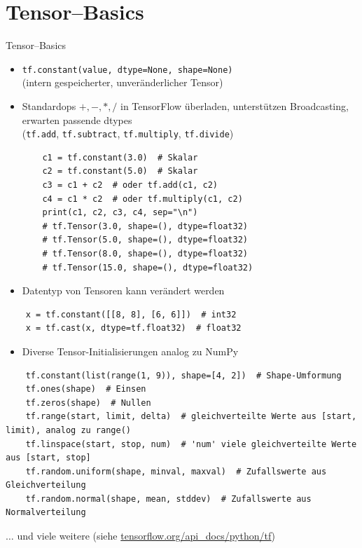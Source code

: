\documentclass[utf8, smaller, c]{beamer}
\renewcommand{\tt}[1]{{\texttt{#1}}}
\begin{document}
\section{Tensor--Basics}
\begin{frame}{Tensor--Basics}
	\begin{itemize}
		\item \tt{tf.constant(value, dtype=None, shape=None)}\\(intern gespeicherter, unveränderlicher Tensor)
		\item Standardops $+,-,*,/$ in TensorFlow überladen, unterstützen Broadcasting, erwarten passende dtypes\\(\tt{tf.add}, \tt{tf.subtract}, \tt{tf.multiply}, \tt{tf.divide})
	\begin{lstlisting}
	c1 = tf.constant(3.0)  # Skalar
    c2 = tf.constant(5.0)  # Skalar
    c3 = c1 + c2  # oder tf.add(c1, c2)
    c4 = c1 * c2  # oder tf.multiply(c1, c2)
    print(c1, c2, c3, c4, sep="\n")
	# tf.Tensor(3.0, shape=(), dtype=float32)
    # tf.Tensor(5.0, shape=(), dtype=float32)
    # tf.Tensor(8.0, shape=(), dtype=float32)
    # tf.Tensor(15.0, shape=(), dtype=float32)
	\end{lstlisting}
	\end{itemize}

    \framebreak
    
    \begin{itemize}
        \item Datentyp von Tensoren kann verändert werden
    \end{itemize}
    \begin{lstlisting}
    x = tf.constant([[8, 8], [6, 6]])  # int32
    x = tf.cast(x, dtype=tf.float32)  # float32
    \end{lstlisting}
    \begin{itemize}
        \item Diverse Tensor-Initialisierungen analog zu NumPy
    \end{itemize}
    \begin{lstlisting}
    tf.constant(list(range(1, 9)), shape=[4, 2])  # Shape-Umformung
    tf.ones(shape)  # Einsen
    tf.zeros(shape)  # Nullen
    tf.range(start, limit, delta)  # gleichverteilte Werte aus [start, limit), analog zu range()
    tf.linspace(start, stop, num)  # 'num' viele gleichverteilte Werte aus [start, stop]
    tf.random.uniform(shape, minval, maxval)  # Zufallswerte aus Gleichverteilung
    tf.random.normal(shape, mean, stddev)  # Zufallswerte aus Normalverteilung
    \end{lstlisting}
    $\dots$ und viele weitere (siehe {\footnotesize\url{tensorflow.org/api_docs/python/tf}}) 
    

\end{frame}
\end{document}
